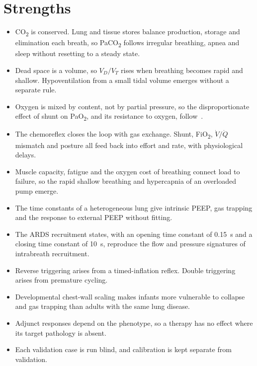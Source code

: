 \section{Strengths}
\label{sec:app-str}
\begin{itemize}
\item CO\textsubscript{2} is conserved. Lung and tissue stores balance production, storage and elimination each breath, so PaCO\textsubscript{2} follows irregular breathing, apnea and sleep without resetting to a steady state.
\item Dead space is a volume, so $V_D/V_T$ rises when breathing becomes rapid and shallow. Hypoventilation from a small tidal volume emerges without a separate rule.
\item Oxygen is mixed by content, not by partial pressure, so the disproportionate effect of shunt on PaO\textsubscript{2}, and its resistance to oxygen, follow~\citep{west1969}.
\item The chemoreflex closes the loop with gas exchange. Shunt, FiO\textsubscript{2}, $\dot V/\dot Q$ mismatch and posture all feed back into effort and rate, with physiological delays.
\item Muscle capacity, fatigue and the oxygen cost of breathing connect load to failure, so the rapid shallow breathing and hypercapnia of an overloaded pump emerge.
\item The time constants of a heterogeneous lung give intrinsic PEEP, gas trapping and the response to external PEEP without fitting.
\item The ARDS recruitment states, with an opening time constant of \SI{0.15}{\second} and a closing time constant of \SI{10}{\second}, reproduce the flow and pressure signatures of intrabreath recruitment.
\item Reverse triggering arises from a timed-inflation reflex. Double triggering arises from premature cycling.
\item Developmental chest-wall scaling makes infants more vulnerable to collapse and gas trapping than adults with the same lung disease.
\item Adjunct responses depend on the phenotype, so a therapy has no effect where its target pathology is absent.
\item Each validation case is run blind, and calibration is kept separate from validation.
\end{itemize}

